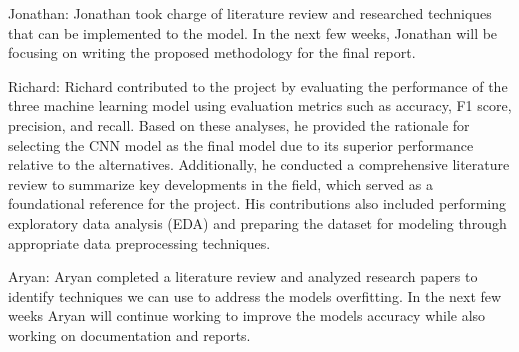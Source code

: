 \documentclass[conference]{IEEEtran}
\begin{document}
Jonathan: Jonathan took charge of literature review and researched techniques that can be implemented to the model. In the next few weeks, Jonathan will be focusing on writing the proposed methodology for the final report.

Richard: Richard contributed to the project by evaluating the performance of the three machine learning model using evaluation metrics such as accuracy, F1 score, precision, and recall. Based on these analyses, he provided the rationale for selecting the CNN model as the final model due to its superior performance relative to the alternatives. Additionally, he conducted a comprehensive literature review to summarize key developments in the field, which served as a foundational reference for the project. His contributions also included performing exploratory data analysis (EDA) and preparing the dataset for modeling through appropriate data preprocessing techniques.

Aryan: Aryan completed a literature review and analyzed research papers to identify techniques we can use to address the models overfitting. In the next few weeks Aryan will continue working to improve the models accuracy while also working on documentation and reports. 
\end{document}
